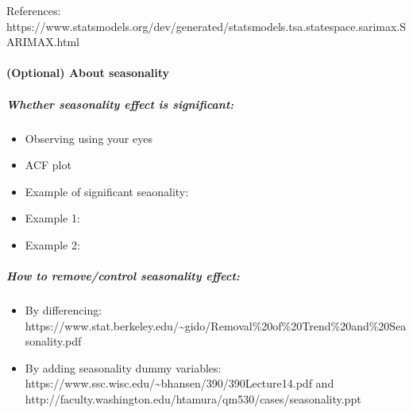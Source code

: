 \documentclass[11pt]{article}
\providecommand{\tightlist}{%
      \setlength{\itemsep}{0pt}\setlength{\parskip}{0pt}}
\begin{document}
References:
https://www.statsmodels.org/dev/generated/statsmodels.tsa.statespace.sarimax.SARIMAX.html

    \paragraph{(Optional) About
seasonality}\label{optional-about-seasonality}

\subparagraph{Whether seasonality effect is
significant:}\label{whether-seasonality-effect-is-significant}

\begin{itemize}
\tightlist
\item
  Observing using your eyes
\item
  ACF plot
\item
  Example of significant seaonality:
\item
  Example 1: 
\item
  Example 2: 
\end{itemize}

\subparagraph{How to remove/control seasonality
effect:}\label{how-to-removecontrol-seasonality-effect}

\begin{itemize}
\tightlist
\item
  By differencing:
  https://www.stat.berkeley.edu/\textasciitilde{}gido/Removal\%20of\%20Trend\%20and\%20Seasonality.pdf
\item
  By adding seasonality dummy variables:
  https://www.ssc.wisc.edu/\textasciitilde{}bhansen/390/390Lecture14.pdf
  and http://faculty.washington.edu/htamura/qm530/cases/seasonality.ppt
\end{itemize}
\end{document}

